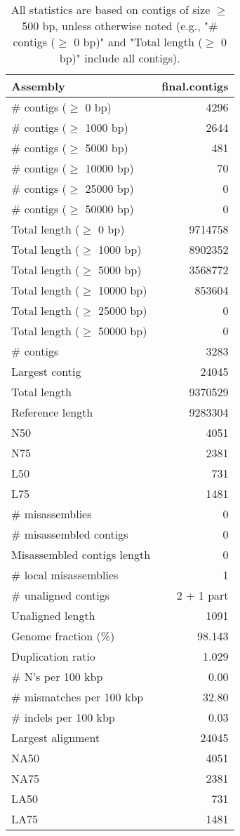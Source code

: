 \documentclass[12pt,a4paper]{article}
\begin{document}
\begin{table}[ht]
\begin{center}
\caption{All statistics are based on contigs of size $\geq$ 500 bp, unless otherwise noted (e.g., "\# contigs ($\geq$ 0 bp)" and "Total length ($\geq$ 0 bp)" include all contigs).}
\begin{tabular}{|l*{1}{|r}|}
\hline
Assembly & final.contigs \\ \hline
\# contigs ($\geq$ 0 bp) & 4296 \\ \hline
\# contigs ($\geq$ 1000 bp) & 2644 \\ \hline
\# contigs ($\geq$ 5000 bp) & 481 \\ \hline
\# contigs ($\geq$ 10000 bp) & 70 \\ \hline
\# contigs ($\geq$ 25000 bp) & 0 \\ \hline
\# contigs ($\geq$ 50000 bp) & 0 \\ \hline
Total length ($\geq$ 0 bp) & 9714758 \\ \hline
Total length ($\geq$ 1000 bp) & 8902352 \\ \hline
Total length ($\geq$ 5000 bp) & 3568772 \\ \hline
Total length ($\geq$ 10000 bp) & 853604 \\ \hline
Total length ($\geq$ 25000 bp) & 0 \\ \hline
Total length ($\geq$ 50000 bp) & 0 \\ \hline
\# contigs & 3283 \\ \hline
Largest contig & 24045 \\ \hline
Total length & 9370529 \\ \hline
Reference length & 9283304 \\ \hline
N50 & 4051 \\ \hline
N75 & 2381 \\ \hline
L50 & 731 \\ \hline
L75 & 1481 \\ \hline
\# misassemblies & 0 \\ \hline
\# misassembled contigs & 0 \\ \hline
Misassembled contigs length & 0 \\ \hline
\# local misassemblies & 1 \\ \hline
\# unaligned contigs & 2 + 1 part \\ \hline
Unaligned length & 1091 \\ \hline
Genome fraction (\%) & 98.143 \\ \hline
Duplication ratio & 1.029 \\ \hline
\# N's per 100 kbp & 0.00 \\ \hline
\# mismatches per 100 kbp & 32.80 \\ \hline
\# indels per 100 kbp & 0.03 \\ \hline
Largest alignment & 24045 \\ \hline
NA50 & 4051 \\ \hline
NA75 & 2381 \\ \hline
LA50 & 731 \\ \hline
LA75 & 1481 \\ \hline
\end{tabular}
\end{center}
\end{table}
\end{document}
